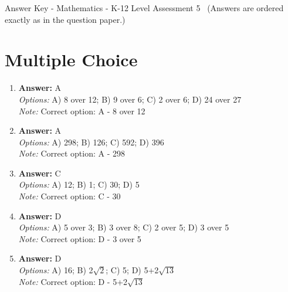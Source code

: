 \documentclass[12pt]{article}
\begin{document}
\begin{center}
Answer Key - Mathematics - K-12 Level Assessment 5 \
\small (Answers are ordered exactly as in the question paper.)
\end{center}

\section*{Multiple Choice}
\begin{enumerate}[label=\arabic*.]
\item \textbf{Answer:} A
\\ \textit{Options:} A) 8 over 12; B) 9 over 6; C) 2 over 6; D) 24 over 27
\\ \textit{Note:} Correct option: A - 8 over 12
\item \textbf{Answer:} A
\\ \textit{Options:} A) 298; B) 126; C) 592; D) 396
\\ \textit{Note:} Correct option: A - 298
\item \textbf{Answer:} C
\\ \textit{Options:} A) 12; B) 1; C) 30; D) 5
\\ \textit{Note:} Correct option: C - 30
\item \textbf{Answer:} D
\\ \textit{Options:} A) 5 over 3; B) 3 over 8; C) 2 over 5; D) 3 over 5
\\ \textit{Note:} Correct option: D - 3 over 5
\item \textbf{Answer:} D
\\ \textit{Options:} A) 16; B) 2\ensuremath{\sqrt{2}}; C) 5; D) 5+2\ensuremath{\sqrt{13}}
\\ \textit{Note:} Correct option: D - 5+2\ensuremath{\sqrt{13}}
\end{enumerate}
\end{document}

